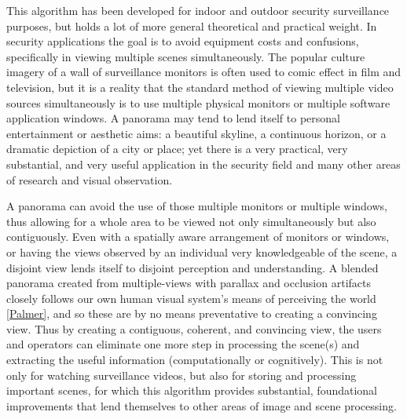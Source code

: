 %
%
%
%
%
%
%
%
%

%
%
%



This algorithm has been developed for indoor and outdoor security surveillance purposes, but holds a lot of more general theoretical and practical weight. In security applications the goal is to avoid equipment costs and confusions, specifically in viewing multiple scenes simultaneously. The popular culture imagery of a wall of surveillance monitors is often used to comic effect in film and television, but it is a reality that the standard method of viewing multiple video sources simultaneously is to use multiple physical monitors or multiple software application windows. A panorama may tend to lend itself to personal entertainment or aesthetic aims: a beautiful skyline, a continuous horizon, or a dramatic depiction of a city or place; yet there is a very practical, very substantial, and very useful application in the security field and many other areas of research and visual observation.

A panorama can avoid the use of those multiple monitors or multiple windows, thus allowing for a whole area to be viewed not only simultaneously but also contiguously. Even with a spatially aware arrangement of monitors or windows, or having the views observed by an individual very knowledgeable of the scene, a disjoint view lends itself to disjoint perception and understanding. A blended panorama created from multiple-views with parallax and occlusion artifacts closely follows our own human visual system's means of perceiving the world \ref{Palmer}, and so these are by no means preventative to creating a convincing view. Thus by creating a contiguous, coherent, and convincing view, the users and operators can eliminate one more step in processing the scene(s) and extracting the useful information (computationally or cognitively). This is not only for watching surveillance videos, but also for storing and processing important scenes, for which this algorithm provides substantial, foundational improvements that lend themselves to other areas of image and scene processing.

